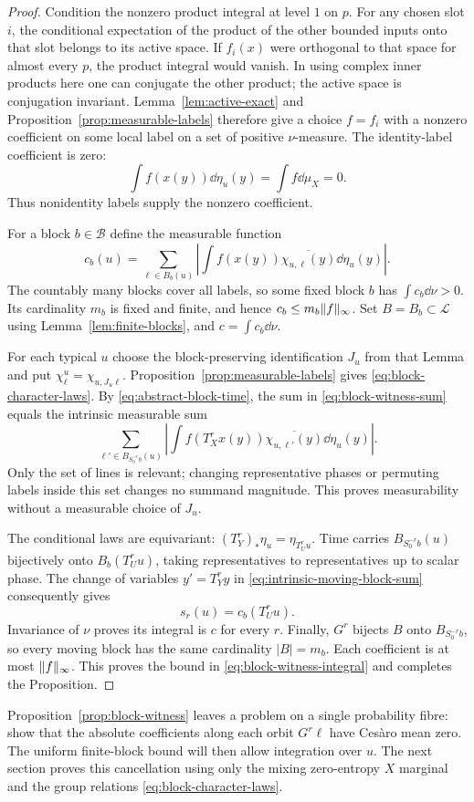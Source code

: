 \begin{proof}
Condition the nonzero product integral at level $1$ on $p$.
For any chosen slot $i$, the conditional expectation of the product
of the other bounded inputs onto that slot belongs to its active
space. If $f_i(x)$ were orthogonal to that space for almost every
$p$, the product integral would vanish. In using complex inner
products here one can conjugate the other product; the active
space is conjugation invariant.
Lemma~\ref{lem:active-exact} and
Proposition~\ref{prop:measurable-labels} therefore give a choice
$f=f_i$ with a nonzero coefficient on some local label on a set of
positive $\nu$-measure. The identity-label coefficient is zero:
\[
 \int f(x(y))\dd\eta_u(y)=\int f\dd\mu_X=0.
\]
Thus nonidentity labels supply the nonzero coefficient.

For a block $b\in\mathcal B$ define the measurable function
\[
 c_b(u)=\sum_{\ell\in B_b(u)}
 \left|\int f(x(y))\overline{\chi_{u,\ell}(y)}\dd\eta_u(y)\right|.
\]
The countably many blocks cover all labels, so some fixed block $b$
has $\int c_b\dd\nu>0$. Its cardinality $m_b$ is fixed and finite,
and hence $c_b\le m_b\lVert f\rVert_\infty$.
Set $B=B_b\subset\mathcal L$ using
Lemma~\ref{lem:finite-blocks}, and $c=\int c_b\dd\nu$.

For each typical $u$ choose the block-preserving identification $J_u$
from that Lemma and put
$\chi_\ell^u=\chi_{u,J_u\ell}$.
Proposition~\ref{prop:measurable-labels} gives
\eqref{eq:block-character-laws}.
By \eqref{eq:abstract-block-time}, the sum in
\eqref{eq:block-witness-sum} equals the intrinsic measurable sum
\begin{equation}\label{eq:intrinsic-moving-block-sum}
 \sum_{\ell'\in B_{S_0^{-r}b}(u)}
 \left|\int f(T_X^r x(y))
                  \overline{\chi_{u,\ell'}(y)}\dd\eta_u(y)\right|.
\end{equation}
Only the set of lines is relevant; changing representative phases
or permuting labels inside this set changes no summand magnitude.
This proves measurability without a measurable choice of $J_u$.

The conditional laws are equivariant:
$(T_Y^r)_*\eta_u=\eta_{T_U^r u}$.
Time carries $B_{S_0^{-r}b}(u)$ bijectively onto
$B_b(T_U^r u)$, taking representatives to representatives up to
scalar phase. The change of variables $y'=T_Y^r y$ in
\eqref{eq:intrinsic-moving-block-sum} consequently gives
\begin{equation}\label{eq:witness-block-transport}
 s_r(u)=c_b(T_U^r u).
\end{equation}
Invariance of $\nu$ proves its integral is $c$ for every $r$.
Finally, $G^r$ bijects $B$ onto $B_{S_0^{-r}b}$, so every moving
block has the same cardinality $|B|=m_b$. Each coefficient is at
most $\lVert f\rVert_\infty$. This proves the bound in
\eqref{eq:block-witness-integral} and completes the Proposition.
\end{proof}

Proposition~\ref{prop:block-witness} leaves a problem on a single
probability fibre: show that the absolute coefficients along each
orbit $G^r\ell$ have Ces\`aro mean zero. The uniform finite-block
bound will then allow integration over $u$. The next section proves
this cancellation using only the mixing zero-entropy $X$ marginal
and the group relations \eqref{eq:block-character-laws}.
